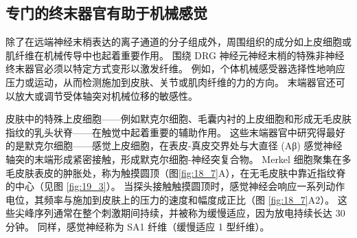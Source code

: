 \subsection{专门的终末器官有助于机械感觉}

除了在远端神经末梢表达的离子通道的分子组成外，周围组织的成分如上皮细胞或肌纤维在机械传导中也起着重要作用。 
围绕 DRG 神经元神经末梢的特殊非神经终末器官必须以特定方式变形以激发纤维。 
例如，个体机械感受器选择性地响应压力或运动，从而检测施加到皮肤、关节或肌肉纤维的力的方向。 
末端器官还可以放大或调节受体轴突对机械位移的敏感性。


皮肤中的特殊上皮细胞——例如默克尔细胞、毛囊内衬的上皮细胞和形成无毛皮肤指纹的乳头状脊——在触觉中起着重要的辅助作用。 
这些末端器官中研究得最好的是默克尔细胞——感觉上皮细胞，在表皮-真皮交界处与大直径 (Aβ) 感觉神经轴突的末端形成紧密接触，形成默克尔细胞-神经突复合物。 
Merkel 细胞聚集在多毛皮肤表皮的肿胀处，称为触摸圆顶（图\ref{fig:18_7}A），在无毛皮肤中靠近指纹脊的中心（见图 \ref{fig:19_3}）。 
当探头接触触摸圆顶时，感觉神经会响应一系列动作电位，其频率与施加到皮肤上的压力的速度和幅度成正比（图 \ref{fig:18_7}A2）。 
这些尖峰序列通常在整个刺激期间持续，并被称为缓慢适应，因为放电持续长达 30 分钟。 
同样，感觉神经称为 SA1 纤维（缓慢适应 1 型纤维）。

